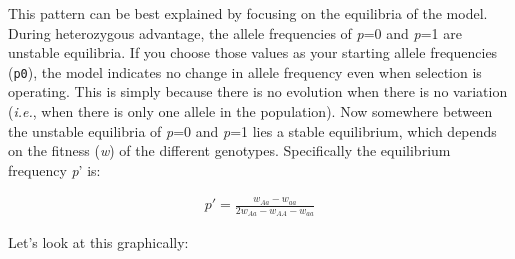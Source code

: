 \documentclass[
]{book}
\begin{document}
This pattern can be best explained by focusing on the equilibria of the model. During heterozygous advantage, the allele frequencies of \emph{p}=0 and \emph{p}=1 are unstable equilibria. If you choose those values as your starting allele frequencies (\texttt{p0}), the model indicates no change in allele frequency even when selection is operating. This is simply because there is no evolution when there is no variation (\emph{i.e.}, when there is only one allele in the population). Now somewhere between the unstable equilibria of \emph{p}=0 and \emph{p}=1 lies a stable equilibrium, which depends on the fitness (\emph{w}) of the different genotypes. Specifically the equilibrium frequency \emph{p}' is:

\begin{align} 
p' = \frac{w_{Aa}-w_{aa}}{2w_{Aa}-w_{AA}-w_{aa}} \label{eq:22}
\end{align}

Let's look at this graphically:
\end{document}
